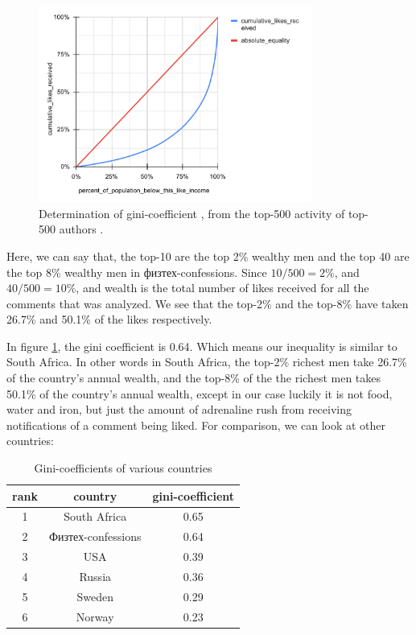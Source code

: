 \documentclass[
	12pt
] {article}
\begin{document}
	\begin{figure}[H]
		\centering
		\includegraphics[width=0.8\textwidth]{fig-gini-calculation}
		\caption{Determination of gini-coefficient \cite{wikipedia-gini}, from the top-500 activity of top-500 authors \cite{sheet-calc-gini-coefficient}.}
		\label{fig-gini-calculation}
	\end{figure}

	Here, we can say that, the top-10 are the top \num{2}\% wealthy men and the top 40 are the top \num{8}\% wealthy men in физтех-confessions. Since $10/500 = 2\%$, and $40/500 = 10\%$, and wealth is the total number of likes received for all the comments that was analyzed. We see that the top-2\% and the top-8\% have taken \num{26.7}\% and \num{50.1}\% of the likes respectively.

	In figure \ref{fig-gini-calculation}, the gini coefficient is \num{0.64}. Which means our inequality is similar to South Africa. In other words in South Africa, the top-\num{2}\% richest men take \num{26.7}\% of the country's annual wealth, and the top-\num{8}\% of the the richest men takes \num{50.1}\% of the country's annual wealth, except in our case luckily it is not food, water and iron, but just the amount of adrenaline rush from receiving notifications of a comment being liked. For comparison, we can look at other countries:
	\begin{table}[H]
		\centering
		\caption{Gini-coefficients of various countries}
		\label{table:gini-countries}
		\begin{tabular}{| c | c | c |} %
			\hline
			rank & country & gini-coefficient \\
			\hline
			1 & South Africa & \num{0.65} \\
			2 & Физтех-confessions & \num{0.64} \\
			3 & USA & \num{0.39} \\
			4 & Russia & \num{0.36} \\
			5 & Sweden & \num{0.29} \\
			6 & Norway & \num{0.23} \\
			\hline
		\end{tabular}
	\end{table}
\end{document}
